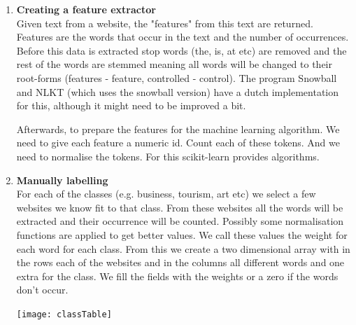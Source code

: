 \begin{enumerate}
    \item \textbf{Creating a feature extractor} \\
    Given text from a website, the "features" from this text are returned. Features are the words that occur in the text and the number of occurrences. Before this data is extracted stop words (the, is, at etc) are removed and the rest of the words are stemmed meaning all words will be changed to their root-forms (features - feature, controlled - control). The program Snowball \cite{snowball_dutch} and NLKT \cite{nlkt_stemming} (which uses the snowball version) have a dutch implementation for this, although it might need to be improved a bit.
    
    Afterwards, to prepare the features for the machine learning algorithm. We need to give each feature a numeric id. Count each of these tokens. And we need to normalise the tokens. For this scikit-learn provides algorithms.
    \item \textbf{Manually labelling} \\
    For each of the classes (e.g. business, tourism, art etc) we select a few websites we know fit to that class. From these websites all the words will be extracted and their occurrence will be counted. Possibly some normalisation functions are applied to get better values. We call these values the weight for each word for each class. From this we create a two dimensional array with in the rows each of the websites and in the columns all different words and one extra for the class. We fill the fields with the weights or a zero if the words don't occur.
    
    \texttt{[image: classTable]}
    

\end{enumerate}
